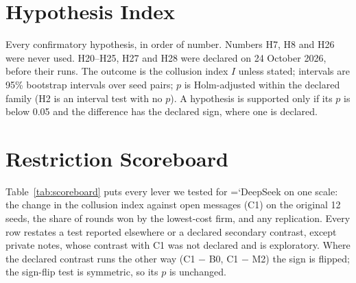 \documentclass[11pt]{article}
\newcommand{\model}[1]{{\ttfamily\hyphenchar\font=`\-\relax #1}}
\newcommand{\DS}{\model{DeepSeek}}
\begin{document}
\section{Hypothesis Index}
\label{app:hyp}
Every confirmatory hypothesis, in order of number. Numbers H7, H8 and H26 were never used. H20--H25, H27 and H28 were declared on 24 October 2026, before their runs. The outcome is the collusion index $I$ unless stated; intervals are 95\% bootstrap intervals over seed pairs; $p$ is Holm-adjusted within the declared family (H2 is an interval test with no $p$). A hypothesis is supported only if its $p$ is below 0.05 and the difference has the declared sign, where one is declared.

\begin{table}[t]
\centering\small
\caption{Hypothesis index, from the result tables in \texttt{results/}.}
\label{tab:hyp}
\setlength{\tabcolsep}{3pt}
\end{table}

\section{Restriction Scoreboard}
\label{app:scoreboard}

Table~\ref{tab:scoreboard} puts every lever we tested for \DS{} on one scale: the change in the collusion index against open messages (\textcolor{cC}{C1}) on the original 12 seeds, the share of rounds won by the lowest-cost firm, and any replication. Every row restates a test reported elsewhere or a declared secondary contrast, except private notes, whose contrast with \textcolor{cC}{C1} was not declared and is exploratory. Where the declared contrast runs the other way (\textcolor{cC}{C1} $-$ \textcolor{cB}{B0}, \textcolor{cC}{C1} $-$ \textcolor{cM2}{M2}) the sign is flipped; the sign-flip test is symmetric, so its $p$ is unchanged.
\end{document}
